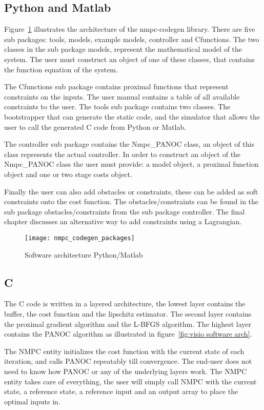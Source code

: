 \subsection{Python and Matlab}
Figure~\ref{fig:nmpc_codegen_packages} illustrates the architecture of the nmpc-codegen library. There are five sub packages: tools, models, example models, controller and Cfunctions.  The two classes in the sub package models, represent the mathematical model of the system. The user must construct an object of one of these classes, that contains the function equation of the system.

The Cfunctions sub package contains proximal functions that represent constraints on the inputs. The user manual contains a table of all available constraints to the user. The tools sub package contains two classes. The bootstrapper that can generate the static code, and the simulator that allows the user to call the generated C code from Python or Matlab.

The controller sub package contains the Nmpc\_PANOC class, an object of this class represents the actual controller. In order to construct an object of the Nmpc\_PANOC class the user must provide: a model object, a proximal function object and one or two stage costs object.

Finally the user can also add obstacles or constraints, these can be added as soft constraints onto the cost function. The obstacles/constraints can be found in the sub package obstacles/constraints from the sub package controller. The final chapter discusses an alternative way to add constraints using a Lagrangian.
	\begin{figure}[H]
		\centering
		\texttt{[image: nmpc\_codegen\_packages]}
		\caption{Software architecture Python/Matlab}
		\label{fig:nmpc_codegen_packages}
	\end{figure}

\subsection{C}
The C code is written in a layered architecture, the lowest layer contains the buffer, the cost function and the lipschitz estimator. The second layer contains the proximal gradient algorithm and the L-BFGS algorithm. The highest layer contains the PANOC algorithm as illustrated in figure~\ref{fig:visio software arch}.

The NMPC entity initializes the cost function with the current state of each iteration, and calls PANOC repeatably till convergence. The end-user does not need to know how PANOC or any of the underlying layers work. The NMPC entity takes care of everything, the user will simply call NMPC with the current state, a reference state, a reference input and an output array to place the optimal inputs in.

